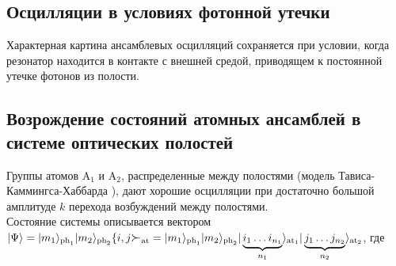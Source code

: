 \clearpage
\subsection{Осцилляции в условиях фотонной утечки}
Характерная картина ансамблевых осцилляций сохраняется при условии, когда резонатор находится в контакте с внешней средой, приводящем к постоянной утечке фотонов из полости.
\begin{figure}[h!]
	\noindent{}
\end{figure}

\subsection{Возрождение состояний атомных ансамблей в системе оптических полостей}
\vspace{-2em}
Группы атомов $\mathrm{A}_1$ и $\mathrm{A}_2$, распределенные между полостями (модель Тависа-Каммингса-Хаббарда \cite{tch_photon_blockade,tch_transfer,tch_quality}), дают хорошие осцилляции при достаточно большой амплитуде $k$ перехода возбуждений между полостями. 
\\[12pt]
\noindent Состояние системы описывается вектором\\
$|\Psi\ra=|m_1\ra_{\mathrm{ph}_\mathrm{1}}|m_2\ra_{\mathrm{ph}_{\mathrm{2}}}\{i, j\Succ_{\mathrm{at}} = |m_1\ra_{\mathrm{ph}_\mathrm{1}}|m_2\ra_{\mathrm{ph}_{\mathrm{2}}}|\protect\underbrace{i_1 \dots i_{n_1}}_{n_1}\ra_{\mathrm{at_1}}|\protect\underbrace{j_1 \dots j_{n_2}}_{n_2}\ra_{\mathrm{at_2}}$, где

